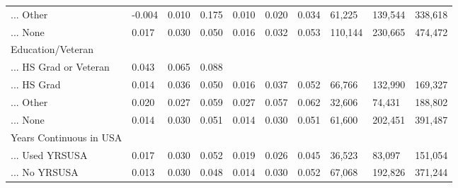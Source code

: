 \documentclass[
  letterpaper,
  DIV=11,
  numbers=noendperiod]{scrartcl}
\begin{document}
\begin{table}[!htbp]
{\begin{tabular}{llllllllll}
... Other & -0.004 & 0.010 & 0.175 & 0.010 & 0.020 & 0.034 & 61,225 & 139,544 & 338,618 \\ 
... None & 0.017 & 0.030 & 0.050 & 0.016 & 0.032 & 0.053 & 110,144 & 230,665 & 474,472 \\ 
Education/Veteran &  &  &  &  &  &  &  &  &  \\ 
... HS Grad or Veteran & 0.043 & 0.065 & 0.088 &  &  &  &  &  &  \\ 
... HS Grad & 0.014 & 0.036 & 0.050 & 0.016 & 0.037 & 0.052 & 66,766 & 132,990 & 169,327 \\ 
... Other & 0.020 & 0.027 & 0.059 & 0.027 & 0.057 & 0.062 & 32,606 & 74,431 & 188,802 \\ 
... None & 0.014 & 0.030 & 0.051 & 0.014 & 0.030 & 0.051 & 61,600 & 202,451 & 391,487 \\ 
Years Continuous in USA &  &  &  &  &  &  &  &  &  \\ 
... Used YRSUSA & 0.017 & 0.030 & 0.052 & 0.019 & 0.026 & 0.045 & 36,523 & 83,097 & 151,054 \\ 
... No YRSUSA & 0.013 & 0.030 & 0.048 & 0.014 & 0.030 & 0.052 & 67,068 & 192,826 & 371,244\\ 
\hline
\hline
\end{tabular}
}
\end{table}
\end{document}
